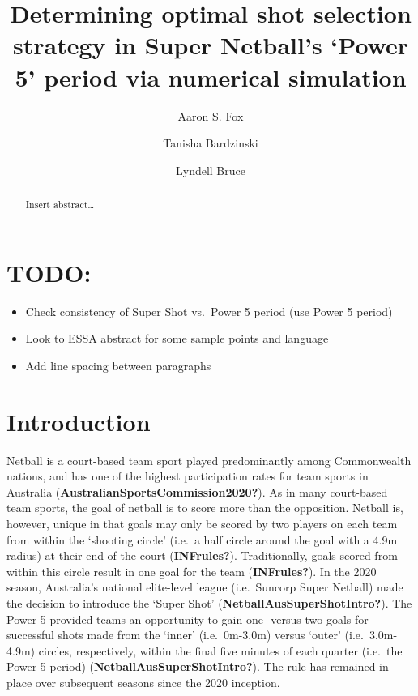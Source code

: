 \documentclass[]{elsarticle} %
\providecommand{\tightlist}{%
  \setlength{\itemsep}{0pt}\setlength{\parskip}{0pt}}
\begin{document}
\begin{frontmatter}

  \title{Determining optimal shot selection strategy in Super Netball's
`Power 5' period via numerical simulation}
    \author[Centre for Sport Research]{Aaron S. Fox}
  
    \author[Centre for Sport Research]{Tanisha Bardzinski}
  
    \author[Centre for Sport Research]{Lyndell Bruce}
  
      \address[Centre for Sport Research]{Centre for Sport Research,
School of Exercise and Nutrition Sciences, Deakin University, Geelong,
Australia}
  
  \begin{abstract}
  Insert abstract\ldots{}
  \end{abstract}
  
 \end{frontmatter}

\hypertarget{todo}{%
\section{TODO:}\label{todo}}

\begin{itemize}
\tightlist
\item
  Check consistency of Super Shot vs.~Power 5 period (use Power 5
  period)
\item
  Look to ESSA abstract for some sample points and language
\item
  Add line spacing between paragraphs
\end{itemize}

\hypertarget{introduction}{%
\section{Introduction}\label{introduction}}

Netball is a court-based team sport played predominantly among
Commonwealth nations, and has one of the highest participation rates for
team sports in Australia (\textbf{AustralianSportsCommission2020?}). As
in many court-based team sports, the goal of netball is to score more
than the opposition. Netball is, however, unique in that goals may only
be scored by two players on each team from within the `shooting circle'
(i.e.~a half circle around the goal with a 4.9m radius) at their end of
the court (\textbf{INFrules?}). Traditionally, goals scored from within
this circle result in one goal for the team (\textbf{INFrules?}). In the
2020 season, Australia's national elite-level league (i.e.~Suncorp Super
Netball) made the decision to introduce the `Super Shot'
(\textbf{NetballAusSuperShotIntro?}). The Power 5 provided teams an
opportunity to gain one- versus two-goals for successful shots made from
the `inner' (i.e.~0m-3.0m) versus `outer' (i.e.~3.0m-4.9m) circles,
respectively, within the final five minutes of each quarter (i.e.~the
Power 5 period) (\textbf{NetballAusSuperShotIntro?}). The rule has
remained in place over subsequent seasons since the 2020 inception.
\end{document}
